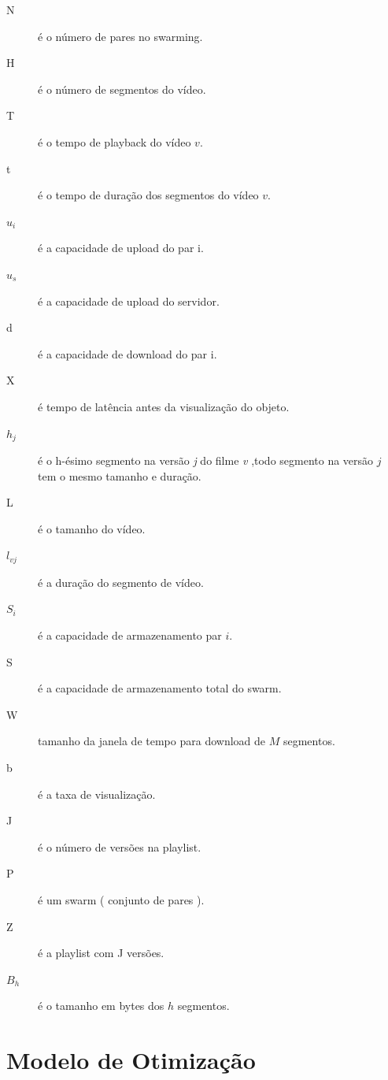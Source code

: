 \documentclass[
	12pt,				%
	oneside,			%
	a4paper,			%
	english,			%
	brazil				%
	]{abntex2ppgsi}
\begin{document}
\begin{description}
\item[N] 	é o número de pares no swarming.
\item[H] 	é o número de segmentos do vídeo. 
\item[T] 	é o tempo de playback do vídeo $v$.
\item[t] 	é o tempo de duração dos segmentos do vídeo $v$.
\item[$u_i$] é a capacidade de upload do par i.
\item[$u_s$] é a capacidade de upload do servidor.
\item[d] 	é a capacidade de download do par i.
\item[X] 	é tempo de latência antes da visualização do objeto.
\item[$h_j$] 	é o h-ésimo segmento na versão \textit{j} do filme \textit{v}  ,todo segmento na versão $j$ tem o mesmo tamanho e duração.
\item[L] 	é o tamanho do vídeo.
\item[$l_{vj}$] 	é a duração do segmento de vídeo.
\item[$S_i$] 	é a capacidade de armazenamento par $i$.
\item[S] 	é a capacidade de armazenamento total do swarm.
\item[W] 	tamanho da janela de tempo para download de $M$ segmentos.
\item[b]  	é a taxa de visualização.
\item[J]  	é o número de versões na playlist.
\item[P]  	é um swarm ( conjunto de pares ).
\item [Z]	é a playlist com J versões.
\item[$B_h$]	é o tamanho em bytes dos $h$ segmentos.
\end{description}



\section{Modelo de Otimização}


\end{document}
